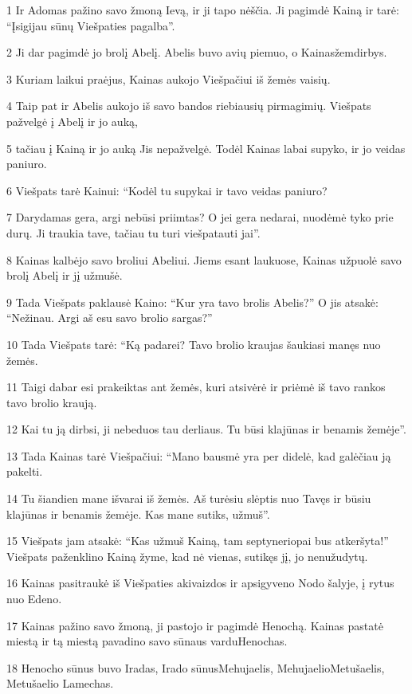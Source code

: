 \par 1 Ir Adomas pažino savo žmoną Ievą, ir ji tapo nėščia. Ji pagimdė Kainą ir tarė: “Įsigijau sūnų Viešpaties pagalba”. 
\par 2 Ji dar pagimdė jo brolį Abelį. Abelis buvo avių piemuo, o Kainas­žemdirbys. 
\par 3 Kuriam laikui praėjus, Kainas aukojo Viešpačiui iš žemės vaisių. 
\par 4 Taip pat ir Abelis aukojo iš savo bandos riebiausių pirmagimių. Viešpats pažvelgė į Abelį ir jo auką, 
\par 5 tačiau į Kainą ir jo auką Jis nepažvelgė. Todėl Kainas labai supyko, ir jo veidas paniuro. 
\par 6 Viešpats tarė Kainui: “Kodėl tu supykai ir tavo veidas paniuro? 
\par 7 Darydamas gera, argi nebūsi priimtas? O jei gera nedarai, nuodėmė tyko prie durų. Ji traukia tave, tačiau tu turi viešpatauti jai”. 
\par 8 Kainas kalbėjo savo broliui Abeliui. Jiems esant laukuose, Kainas užpuolė savo brolį Abelį ir jį užmušė. 
\par 9 Tada Viešpats paklausė Kaino: “Kur yra tavo brolis Abelis?” O jis atsakė: “Nežinau. Argi aš esu savo brolio sargas?” 
\par 10 Tada Viešpats tarė: “Ką padarei? Tavo brolio kraujas šaukiasi manęs nuo žemės. 
\par 11 Taigi dabar esi prakeiktas ant žemės, kuri atsivėrė ir priėmė iš tavo rankos tavo brolio kraują. 
\par 12 Kai tu ją dirbsi, ji nebeduos tau derliaus. Tu būsi klajūnas ir benamis žemėje”. 
\par 13 Tada Kainas tarė Viešpačiui: “Mano bausmė yra per didelė, kad galėčiau ją pakelti. 
\par 14 Tu šiandien mane išvarai iš žemės. Aš turėsiu slėptis nuo Tavęs ir būsiu klajūnas ir benamis žemėje. Kas mane sutiks, užmuš”. 
\par 15 Viešpats jam atsakė: “Kas užmuš Kainą, tam septyneriopai bus atkeršyta!” Viešpats paženklino Kainą žyme, kad nė vienas, sutikęs jį, jo nenužudytų. 
\par 16 Kainas pasitraukė iš Viešpaties akivaizdos ir apsigyveno Nodo šalyje, į rytus nuo Edeno. 
\par 17 Kainas pažino savo žmoną, ji pastojo ir pagimdė Henochą. Kainas pastatė miestą ir tą miestą pavadino savo sūnaus vardu­Henochas. 
\par 18 Henocho sūnus buvo Iradas, Irado sūnus­Mehujaelis, Mehujaelio­Metušaelis, Metušaelio­ Lamechas. 
